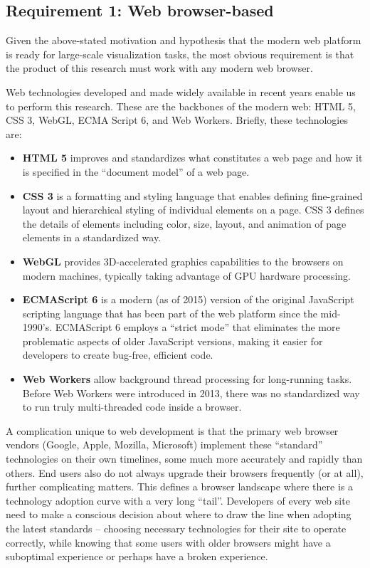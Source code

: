 \hypertarget{requirement-1-web-browser-based}{%
\subsection{Requirement 1: Web browser-based}\label{requirement-1-web-browser-based}}

Given the above-stated motivation and hypothesis that the modern web platform is ready for large-scale visualization tasks, the most obvious requirement is that the product of this research must work with any modern web browser.

Web technologies developed and made widely available in recent years enable us to perform this research. These are the backbones of the modern web: HTML 5, CSS 3, WebGL, ECMA Script 6, and Web Workers. Briefly, these technologies are:

\begin{itemize}
\tightlist
\item
  \textbf{HTML 5} improves and standardizes what constitutes a web page and how it is specified in the ``document model'' of a web page.
\item
  \textbf{CSS 3} is a formatting and styling language that enables defining fine-grained layout and hierarchical styling of individual elements on a page. CSS 3 defines the details of elements including color, size, layout, and animation of page elements in a standardized way.
\item
  \textbf{WebGL} provides 3D-accelerated graphics capabilities to the browsers on modern machines, typically taking advantage of \gls{GPU} hardware processing.
\item
  \textbf{ECMAScript 6} is a modern (as of 2015) version of the original
  JavaScript scripting language that has been part of the web platform
  since the mid-1990's. ECMAScript 6 employs a ``strict mode'' that eliminates the
  more problematic aspects of older JavaScript versions, making it easier for
  developers to create bug-free, efficient code.
\item
  \textbf{Web Workers} allow background thread processing for long-running tasks. Before
  Web Workers were introduced in 2013, there was no standardized way to run truly multi-threaded code inside a browser.
\end{itemize}

A complication unique to web development is that the primary web browser vendors (Google, Apple, Mozilla, Microsoft) implement these ``standard'' technologies on their own timelines, some much more accurately and rapidly than others. End users also do not always upgrade their browsers frequently (or at all), further complicating matters. This defines a browser landscape where there is a technology adoption curve with a very long ``tail''. Developers of every web site need to make a conscious decision about where to draw the line when adopting the latest standards -- choosing necessary technologies for their site to operate correctly, while knowing that some users with older browsers might have a suboptimal experience or perhaps have a broken experience.

